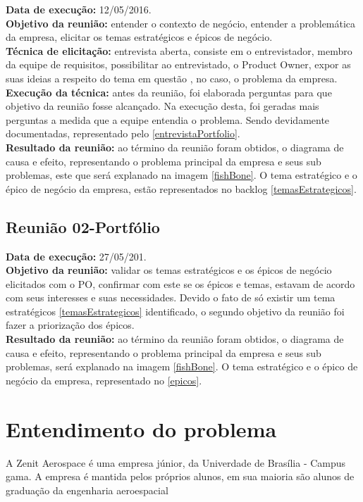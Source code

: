 \indent \textbf{Data de execução:} 12/05/2016.\\
\indent \textbf{Objetivo da reunião:} entender o contexto de negócio, entender a problemática da empresa, elicitar os temas estratégicos e épicos de negócio.\\
\indent \textbf{Técnica de elicitação:} entrevista aberta, consiste em o entrevistador, membro da equipe de requisitos, possibilitar ao entrevistado, o Product Owner, expor as suas ideias a respeito do tema em questão \cite{leffingwell2011}, no caso, o problema da empresa.\\
\indent \textbf{Execução da técnica:} antes da reunião, foi elaborada perguntas para que objetivo da reunião fosse alcançado. Na execução desta, foi geradas mais perguntas a medida que a equipe entendia o problema. Sendo devidamente documentadas, representado pelo \autoref{entrevistaPortfolio}.\\
\indent \textbf{Resultado da reunião:} ao término da reunião foram obtidos, o diagrama de causa e efeito, representando o problema principal da empresa e seus sub problemas, este que será explanado na imagem \ref{fishBone}. O tema estratégico e o épico de negócio da empresa, estão representados no backlog \ref{temasEstrategicos}.\\

\subsection{Reunião 02-Portfólio}\label{Reunião02-Portfólio}

\indent \textbf{Data de execução:} 27/05/201.\\
\indent \textbf{Objetivo da reunião:} validar os temas estratégicos e os épicos de negócio elicitados com o PO, confirmar com este se os épicos e temas, estavam de acordo com seus interesses e suas necessidades. Devido o fato de só existir um tema estratégicos \ref{temasEstrategicos} identificado, o segundo objetivo da reunião foi fazer a priorização dos épicos.\\
\indent \textbf{Resultado da reunião:} ao término da reunião foram obtidos, o diagrama de causa e efeito, representando o problema principal da empresa e seus sub problemas, será explanado na imagem \ref{fishBone}. O tema estratégico e o épico de negócio da empresa, representado no \ref{epicos}.\\

\section{Entendimento do problema}
A Zenit Aerospace é uma empresa júnior, da Univerdade de Brasília - Campus gama. A empresa é mantida pelos próprios alunos, em sua maioria são alunos de graduação da engenharia aeroespacial

